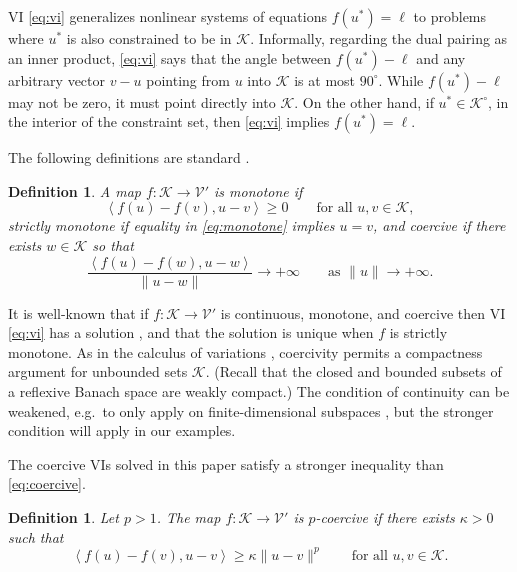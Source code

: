 \documentclass[letterpaper,final,12pt,reqno]{amsart}
\theoremstyle{cstyle}
\theoremstyle{cstyle*}
\theoremstyle{dstyle}
\newtheorem{definition}[theorem]{Definition}
\numberwithin{equation}{section}
\numberwithin{figure}{section}
\numberwithin{table}{section}
\numberwithin{theorem}{section}
\newcommand{\cK}{\mathcal{K}}
\newcommand{\cV}{\mathcal{V}}
\newcommand{\ip}[2]{\left<#1,#2\right>}
\begin{document}
VI \eqref{eq:vi} generalizes nonlinear systems of equations $f(u^*)=\ell$ to problems where $u^*$ is also constrained to be in $\cK$.  Informally, regarding the dual pairing as an inner product, \eqref{eq:vi} says that the angle between $f(u^*)-\ell$ and any arbitrary vector $v-u$ pointing from $u$ into $\cK$ is at most $90^\circ$.  While $f(u^*)-\ell$ may not be zero, it must point directly into $\cK$.  On the other hand, if $u^*\in\cK^\circ$, in the interior of the constraint set, then \eqref{eq:vi} implies $f(u^*)=\ell$.

The following definitions are standard \cite{KinderlehrerStampacchia1980}.

\begin{definition}  A map $f:\cK \to \cV'$ is \emph{monotone} if
\begin{equation}
\ip{f(u)-f(v)}{u-v} \ge 0 \qquad \text{for all } u,v \in \cK, \label{eq:monotone}
\end{equation}
\emph{strictly monotone} if equality in \eqref{eq:monotone} implies $u=v$, and \emph{coercive} if there exists $w \in \cK$ so that
\begin{equation}
\frac{\ip{f(u)-f(w)}{u-w}}{\|u-w\|} \to +\infty \qquad \text{as } \|u\|\to +\infty. \label{eq:coercive}
\end{equation}
\end{definition}

It is well-known that if $f:\cK \to \cV'$ is continuous, monotone, and coercive then VI \eqref{eq:vi} has a solution \cite[Corollary III.1.8]{KinderlehrerStampacchia1980}, and that the solution is unique when $f$ is strictly monotone.  As in the calculus of variations \cite{Evans2010}, coercivity permits a compactness argument for unbounded sets $\cK$.  (Recall that the closed and bounded subsets of a reflexive Banach space are weakly compact.)  The condition of continuity can be weakened, e.g.~to only apply on finite-dimensional subspaces \cite{KinderlehrerStampacchia1980}, but the stronger condition will apply in our examples.

The coercive VIs solved in this paper satisfy a stronger inequality than \eqref{eq:coercive}.

\begin{definition}  Let $p>1$.  The map $f:\cK \to \cV'$ is \emph{$p$-coercive} if there exists $\kappa>0$ such that
\begin{equation}
\ip{f(u)-f(v)}{u-v} \ge \kappa \|u-v\|^p \qquad \text{for all } u,v \in \cK. \label{eq:pcoercive}
\end{equation}
\end{definition}
\end{document}

